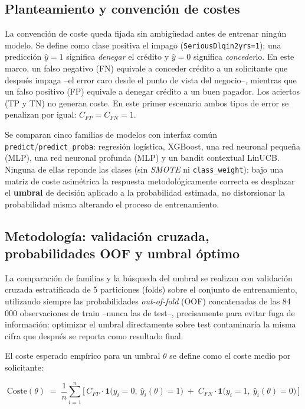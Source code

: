 \documentclass[11pt,a4paper]{article}
\begin{document}
\subsection{Planteamiento y convenci\'on de costes}

La convenci\'on de coste queda fijada sin ambig\"uedad antes de entrenar ning\'un modelo. Se define
como clase positiva el impago (\texttt{SeriousDlqin2yrs=1}); una predicci\'on $\hat y = 1$ significa
\emph{denegar} el cr\'edito y $\hat y = 0$ significa \emph{conceder}lo. En este marco, un falso
negativo (FN) equivale a conceder cr\'edito a un solicitante que despu\'es impaga --el error caro
desde el punto de vista del negocio--, mientras que un falso positivo (FP) equivale a denegar
cr\'edito a un buen pagador. Los aciertos (TP y TN) no generan coste. En este primer escenario ambos
tipos de error se penalizan por igual: $C_{FP} = C_{FN} = 1$.

Se comparan cinco familias de modelos con interfaz com\'un \texttt{predict}/\texttt{predict\_proba}:
regresi\'on log\'istica, XGBoost, una red neuronal peque\~na (MLP), una red neuronal profunda (MLP) y
un bandit contextual LinUCB. Ninguna de ellas reponde las clases (sin \emph{SMOTE} ni
\texttt{class\_weight}): bajo una matriz de coste asim\'etrica la respuesta metodol\'ogicamente
correcta es desplazar el \textbf{umbral} de decisi\'on aplicado a la probabilidad estimada, no
distorsionar la probabilidad misma alterando el proceso de entrenamiento.

\subsection{Metodolog\'ia: validaci\'on cruzada, probabilidades OOF y umbral \'optimo}

La comparaci\'on de familias y la b\'usqueda del umbral se realizan con validaci\'on cruzada
estratificada de 5 particiones (folds) sobre el conjunto de entrenamiento, utilizando siempre las
probabilidades \emph{out-of-fold} (OOF) concatenadas de las 84\,000 observaciones de train --nunca
las de test--, precisamente para evitar fuga de informaci\'on: optimizar el umbral directamente sobre
test contaminar\'ia la misma cifra que despu\'es se reporta como resultado final.

El coste esperado emp\'irico para un umbral $\theta$ se define como el coste medio por solicitante:

\[
\text{Coste}(\theta) \;=\; \frac{1}{n}\sum_{i=1}^{n}
\Big[\, C_{FP}\cdot \mathbf{1}\big(y_i=0,\ \hat y_i(\theta)=1\big)
\;+\; C_{FN}\cdot \mathbf{1}\big(y_i=1,\ \hat y_i(\theta)=0\big) \,\Big]
\]
\end{document}
